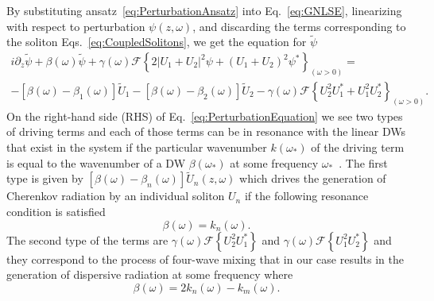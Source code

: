 \documentclass[aps, pra, twocolumn, superscriptaddress, final]{revtex4}
\newcommand{\abs}[1]{\left| #1 \right|}
\begin{document}
\begin{widetext}
By substituting ansatz~\eqref{eq:PerturbationAnsatz} into
Eq.~\eqref{eq:GNLSE}, linearizing with respect to perturbation $\psi(z,
\omega)$, and discarding the terms corresponding to the soliton
Eqs.~\eqref{eq:CoupledSolitons}, we get the equation for $\tilde \psi$
\begin{multline}
  \label{eq:PerturbationEquation}
  i \partial_{z} \tilde \psi
    + \beta(\omega) \tilde \psi
    + \gamma(\omega) \mathcal{F}\left\{
      2 \abs{U_{1} + U_{2}}^{2} \psi +
      \left( U_{1} + U_{2} \right)^{2} \psi^{*}
    \right\}_{(\omega > 0)} = \\
    - \left[ \beta(\omega) - \beta_{1}(\omega) \right] \tilde U_{1}
    - \left[ \beta(\omega) - \beta_{2}(\omega) \right] \tilde U_{2}
    - \gamma(\omega) \mathcal{F} \left\{
      U_{2}^{2} U_{1}^{*} + U_{1}^{2} U_{2}^{*}
    \right\}_{(\omega > 0)}.
\end{multline}
On the right-hand side (RHS) of Eq.~\eqref{eq:PerturbationEquation} we see two
types of driving terms and each of those terms can be in resonance with the
linear DWs that exist in the system if the particular wavenumber
$k(\omega_{*})$ of the driving term is equal to the wavenumber of a DW
$\beta(\omega_{*})$ at some frequency
$\omega_{*}$~\cite{akhmediev1995cherenkov, Yulin:04}. The first type
is given by $\left[ \beta(\omega) - \beta_{n}(\omega) \right] \tilde U_{n}(z,
\omega)$ which drives the generation of Cherenkov radiation by an individual
soliton $U_{n}$ if the following resonance condition is satisfied
\begin{equation}
  \label{eq:CherenkovRadiationResonanceCondition}
  \beta(\omega) = k_{n}(\omega).
\end{equation}
The second type of the terms are $\gamma(\omega) \mathcal{F}\left\{ U_{2}^{2}
U_{1}^{*} \right\}$ and $\gamma(\omega) \mathcal{F}\left\{ U_{1}^{2} U_{2}^{*}
\right\}$ and they correspond to the process of four-wave mixing that in our
case results in the generation of dispersive radiation at some frequency where
\begin{equation}
  \label{eq:FWMRadiationResonanceCondition}
  \beta(\omega) = 2 k_{n}(\omega)  - k_{m}(\omega).
\end{equation}


\end{widetext}
\end{document}
